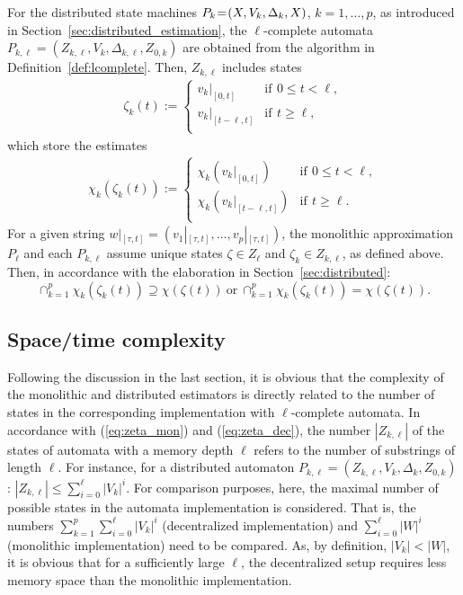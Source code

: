 \documentclass[a4paper, 10pt, conference]{ieeeconf}
\newcommand{\hspm}{\hspace{-2pt}}
\newcommand{\taut}{{_{[\tau,t]}}}
\begin{document}
For the distributed state machines $P_k\hspm=\hspm(X,V_k,\Delta_k,X)$, $k=1,\dots,p$, as introduced in Section~\ref{sec:distributed_estimation}, the $\ell$-complete automata $P_{k,\ell}=(Z_{k,\ell},V_k,\Delta_{k,\ell},Z_{0,k})$ are obtained from the algorithm in Definition~\ref{def:lcomplete}. Then, $Z_{k,\ell}$ includes states
\begin{align}\label{eq:zeta_dec}
   \zeta_k(t):=\left\{\begin{array}{ll}  v_k|_{[0,t]} &\text{if}~\, 0 \leq t <\ell,\\ v_k|_{[t-\ell,t]} &\text{if}~\, t\geq \ell,\\   \end{array} \right.
\end{align}
which store the estimates
\begin{align}
   \chi_k(\zeta_k(t)):=\left\{\begin{array}{ll} \chi_k(v_k|_{[0,t]}) &\text{if}~\, 0\leq t <\ell,\\ \chi_k(v_k|_{[t-\ell,t]}) &\text{if}~\, t\geq \ell.\\   \end{array} \right.
\end{align}
For a given string $w|\taut = (v_1|\taut,\dots, v_p|\taut)$, the monolithic approximation $P_\ell$ and each $P_{k,\ell}$ assume unique states $\zeta\in Z_{\ell}$ and $\zeta_k\in Z_{k,\ell}$, as defined above. Then, in accordance with the elaboration in Section~\ref{sec:distributed}:
\begin{displaymath}
\cap_{k=1}^{p}\chi_k(\zeta_k(t)) \supseteq \chi(\zeta(t))~\text{or}~\cap_{k=1}^{p}\chi_k(\zeta_k(t)) = \chi(\zeta(t)).
\end{displaymath}






\subsection{Space/time complexity}\label{sec:complexity}
Following the discussion in the last section, it is obvious that the complexity of the monolithic and distributed estimators is directly related to the number of states in the corresponding implementation with $\ell$-complete automata. In accordance with (\ref{eq:zeta_mon}) and (\ref{eq:zeta_dec}), the number $|Z_{k,\ell}|$ of the states of automata with a memory depth $\ell$ refers to the number of substrings of length $\ell$. For instance, for a distributed automaton $P_{k,\ell}=(Z_{k,\ell},V_k,\Delta_k,Z_{0,k})$: $|Z_{k,\ell}|\leq \sum_{i=0}^\ell |V_k|^i$.
For comparison purposes, here, the maximal number of possible states in the automata implementation is considered. That is, the numbers $\sum_{k=1}^p\sum_{i=0}^\ell |V_k|^i$ (decentralized implementation) and $\sum_{i=0}^\ell |W|^i$ (monolithic implementation) need to be compared. As, by definition, $|V_k|<|W|$, it is obvious that for a sufficiently large $\ell$, the decentralized setup requires less memory space than the monolithic implementation. 
\end{document}
